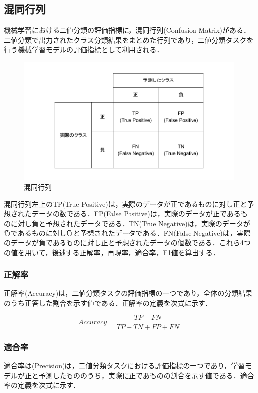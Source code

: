 \subsection{混同行列 \label{c4s2-1}}
機械学習における二値分類の評価指標に，混同行列(Confusion Matrix)がある．二値分類で出力されたクラス分類結果をまとめた行列であり，二値分類タスクを行う機械学習モデルの評価指標として利用される．
 
\begin{figure}[H]
	\centering
	\includegraphics[width=150mm]{image/confusion-matrix.png}
	\caption{混同行列}
	\label{confusion-matrix}
\end{figure}

混同行列左上のTP(True Positive)は，実際のデータが正であるものに対し正と予想されたデータの数である．FP(False Positive)は，実際のデータが正であるものに対し負と予想されたデータである．TN(True Negative)は，実際のデータが負であるものに対し負と予想されたデータである．FN(False Negative)は，実際のデータが負であるものに対し正と予想されたデータの個数である．これら4つの値を用いて，後述する正解率，再現率，適合率，F1値を算出する．

\subsubsection{正解率 \label{c4s2-1a}}
正解率(Accuracy)は，二値分類タスクの評価指標の一つであり，全体の分類結果のうち正答した割合を示す値である．正解率の定義を次式に示す．

$$
Accuracy = \frac{TP+FN}{TP+TN+FP+FN}
$$


\subsubsection{適合率 \label{c4s2-1b}}
適合率は(Precision)は，二値分類タスクにおける評価指標の一つであり，学習モデルが正と予測したもののうち，実際に正であものの割合を示す値である．適合率の定義を次式に示す．

